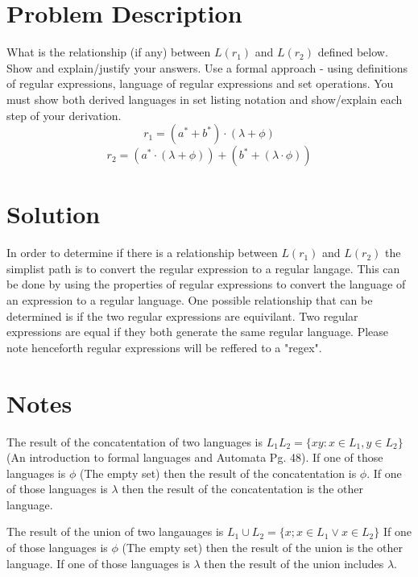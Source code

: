 \documentclass{assignment-x}
\begin{document}
\maketitle
\pagebreak

\section{Problem Description}
What is the relationship (if any) between $L(r_1)$ and $L(r_2)$ defined below. Show and explain/justify your answers. Use a formal approach - using definitions of regular expressions, language of regular expressions and set operations. You must show both derived languages in set listing notation and show/explain each step of your derivation.
$$r_1 = (a^*+b^*)\cdot(\lambda + \phi)$$
$$r_2 = (a^* \cdot (\lambda + \phi))+ (b^* + (\lambda \cdot \phi))$$

\section{Solution}
In order to determine if there is a relationship between $L(r_1)$ and $L(r_2)$ the simplist path is to convert the regular expression to a regular langage. This can be done by using the properties of regular expressions to convert the language of an expression to a regular language. One possible relationship that can be determined is if the two regular expressions are equivilant. Two regular expressions are equal if they both generate the same regular language. Please note henceforth regular expressions will be reffered to a "regex".

\section{Notes}
The result of the concatentation of two languages is $L_1L_2=\{xy: x \in L_1, y \in L_2\}$ (An introduction to formal languages and Automata Pg. 48). 
If one of those languages is $\phi$ (The empty set) then the result of the concatentation is $\phi$.
If one of those languages is ${\lambda}$ then the result of the concatentation is the other language. 

The result of the union of two langauages is $L_1 \cup L_2  = \{x; x\in L_1 \lor x \in L_2\}$
If one of those languages is $\phi$ (The empty set) then the result of the union is the other language.
If one of those languages is ${\lambda}$ then the result of the union includes $\lambda$. 
\end{document}
